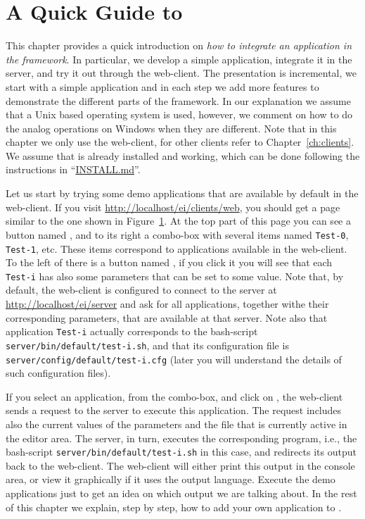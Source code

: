 {%
}

\chapter{A Quick Guide to \ei}

This chapter provides a quick introduction on \emph{how to integrate
  an application in the \ei framework}. In particular, we develop a
simple application, integrate it in the \ei server, and try it out
through the web-client.
%
The presentation is incremental, we start with a simple application
and in each step we add more features to demonstrate the different
parts of the \ei framework.
%
In our explanation we assume that a Unix based operating system is
used, however, we comment on how to do the analog operations on
Windows when they are different.
%
Note that in this chapter we only use the web-client, for other
clients refer to Chapter~\ref{ch:clients}.
%
We assume that \ei is already installed and working, which can be done
following the instructions in
``\href{http://github.com/abstools/easyinterface}{INSTALL.md}''.  
%

Let us start by trying some demo applications that are available by
default in the web-client.
%
If you visit \url{http://localhost/ei/clients/web}, you should get a
page similar to the one shown in Figure~\ref{}.
%
At the top part of this page you can see a button named \applybutton,
and to its right a combo-box with several items named \texttt{Test-0},
\texttt{Test-1}, etc. These items correspond to applications available
in the web-client.
%
To the left of \applybutton there is a button named \settingbutton, if
you click it you will see that each \texttt{Test-i} has also some
parameters that can be set to some value.
%
Note that, by default, the web-client is configured to connect to the
server at \url{http://localhost/ei/server} and ask for all
applications, together withe their corresponding parameters, that are
available at that server. 
%
Note also that application \texttt{Test-i} actually corresponds to the
bash-script \texttt{server/bin/default/test-i.sh}, and that its
configuration file is \texttt{server/config/default/test-i.cfg} (later
you will understand the details of such configuration files).
%

If you select an application, from the combo-box, and click on
\applybutton, the web-client sends a request to the server to execute
this application. The request includes also the current values of the
parameters and the file that is currently active in the editor area.
%
The server, in turn, executes the corresponding program, i.e., the
bash-script \texttt{server/bin/default/test-i.sh} in this case, and
redirects its output back to the web-client.  
%
The web-client will either print this output in the console area, or
view it graphically if it uses the \ei output language. Execute the
demo applications just to get an idea on which output we are talking
about.
%
In the rest of this chapter we explain, step by step, how to add your
own application to \ei.

